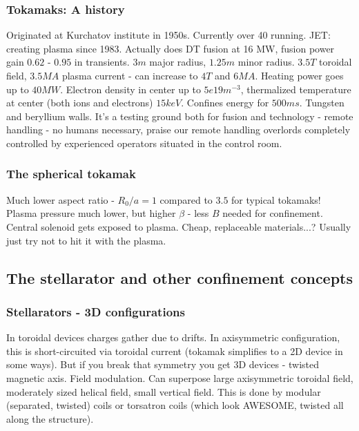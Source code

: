 \documentclass[PlasmaNotes.tex]{subfiles}
\begin{document}
  \subsubsection{Tokamaks: A history}
  
    Originated at Kurchatov institute in 1950s. Currently over 40 running. JET: creating plasma since 1983. Actually does DT fusion at 16 MW, fusion power gain $0.62$ - $0.95$ in transients. $3m$ major radius, $1.25m$ minor radius. $3.5T$ toroidal field, $3.5MA$ plasma current - can increase to $4T$ and $6MA$. Heating power goes up to $40MW$. Electron density in center up to $5e19 m^{-3}$, thermalized temperature at center (both ions and electrons) $15 keV$. Confines energy for $500ms$. Tungsten and beryllium walls. It's a testing ground both for fusion and technology - remote handling - no humans necessary, praise our remote handling overlords completely controlled by experienced operators situated in the control room.
    
  \subsubsection{The spherical tokamak}
  
    Much lower aspect ratio - $R_0/a = 1$ compared to $3.5$ for typical tokamaks! Plasma pressure much lower, but higher $\beta$ - less $B$ needed for confinement. Central solenoid gets exposed to plasma. Cheap, replaceable materials...? Usually just try not to hit it with the plasma.

\subsection{The stellarator and other confinement concepts}

\subsubsection{Stellarators - 3D configurations}
  
      In toroidal devices charges gather due to drifts. In axisymmetric configuration, this is short-circuited via toroidal current (tokamak simplifies to a 2D device in some ways). But if you break that symmetry you get 3D devices - twisted magnetic axis. Field modulation. Can superpose large axisymmetric toroidal field, moderately sized helical field, small vertical field. This is done by modular (separated, twisted) coils or torsatron coils (which look AWESOME, twisted all along the structure).
      
\end{document}
